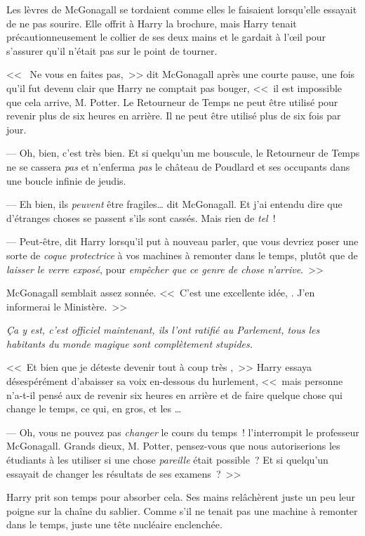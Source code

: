 Les lèvres de McGonagall se tordaient comme elles le faisaient lorsqu'elle essayait de ne pas sourire. Elle offrit à Harry la brochure, mais Harry tenait précautionneusement le collier de ses deux mains et le gardait à l'œil pour s'assurer qu'il n'était pas sur le point de tourner.

<<~ Ne vous en faites pas,~>> dit McGonagall après une courte pause, une fois qu'il fut devenu clair que Harry ne comptait pas bouger, <<~il est impossible que cela arrive, M. Potter. Le Retourneur de Temps ne peut être utilisé pour revenir plus de six heures en arrière. Il ne peut être utilisé plus de six fois par jour.

--- Oh, bien, c'est très bien. Et si quelqu'un me bouscule, le Retourneur de Temps ne se cassera \emph{pas} et n'enferma \emph{pas} le château de Poudlard et ses occupants dans une boucle infinie de jeudis.

--- Eh bien, ils \emph{peuvent} être fragiles… dit McGonagall. Et j'ai entendu dire que d'étranges choses se passent s'ils sont cassés. Mais rien de \emph{tel}~!

--- Peut-être, dit Harry lorsqu'il put à nouveau parler, que vous devriez poser une sorte de \emph{coque protectrice} à vos machines à remonter dans le temps, plutôt que de \emph{laisser le verre exposé}, pour \emph{empêcher que ce genre de chose n'arrive}.~>>

McGonagall semblait assez sonnée. <<~C'est une excellente idée, . J'en informerai le Ministère.~>>

\emph{Ça y est, c'est officiel maintenant, ils l'ont ratifié au Parlement, tous les habitants du monde magique sont complètement stupides.}

<<~Et bien que je déteste devenir tout à coup très ,~>> Harry essaya désespérément d'abaisser sa voix en-dessous du hurlement, <<~mais personne n'a-t-il pensé aux  de revenir six heures en arrière et de faire quelque chose qui change le temps, ce qui, en gros,  et les …

--- Oh, vous ne pouvez pas \emph{changer} le cours du temps~! l'interrompit le professeur McGonagall. Grands dieux, M. Potter, pensez-vous que nous autoriserions les étudiants à les utiliser si une chose \emph{pareille} était possible~? Et si quelqu'un essayait de changer les résultats de ses examens~?~>>

Harry prit son temps pour absorber cela. Ses mains relâchèrent juste un peu leur poigne sur la chaîne du sablier. Comme s'il ne tenait pas une machine à remonter dans le temps, juste une tête nucléaire enclenchée.

